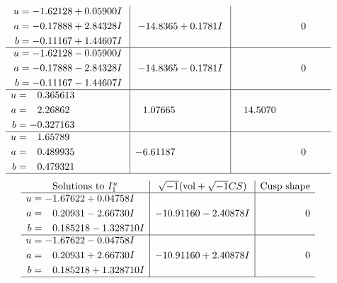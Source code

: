 \documentclass[1p]{elsarticle_modified}
\theoremstyle{definition}
\newcommand{\I}{\sqrt{-1}}
\begin{document}
$$\begin{array}{c|c|c}
\begin{aligned}
u &= -1.62128 + 0.05900 I \\
a &= -0.17888 + 2.84328 I \\
b &= -0.11167 + 1.44607 I\end{aligned}
 & -14.8365 + 0.1781 I & \phantom{-0.000000 } 0 \\ \hline\begin{aligned}
u &= -1.62128 - 0.05900 I \\
a &= -0.17888 - 2.84328 I \\
b &= -0.11167 - 1.44607 I\end{aligned}
 & -14.8365 - 0.1781 I & \phantom{-0.000000 } 0 \\ \hline\begin{aligned}
u &= \phantom{-}0.365613\phantom{ +0.000000I} \\
a &= \phantom{-}2.26862\phantom{ +0.000000I} \\
b &= -0.327163\phantom{ +0.000000I}\end{aligned}
 & \phantom{-}1.07665\phantom{ +0.000000I} & \phantom{-}14.5070\phantom{ +0.000000I} \\ \hline\begin{aligned}
u &= \phantom{-}1.65789\phantom{ +0.000000I} \\
a &= \phantom{-}0.489935\phantom{ +0.000000I} \\
b &= \phantom{-}0.479321\phantom{ +0.000000I}\end{aligned}
 & -6.61187\phantom{ +0.000000I} & \phantom{-0.000000 } 0\\
 \hline 
 \end{array}$$\newpage$$\begin{array}{c|c|c}  
\text{Solutions to }I^u_{1}& \I (\text{vol} + \sqrt{-1}CS) & \text{Cusp shape}\\
 \hline 
\begin{aligned}
u &= -1.67622 + 0.04758 I \\
a &= \phantom{-}0.20931 - 2.66730 I \\
b &= \phantom{-}0.185218 - 1.328710 I\end{aligned}
 & -10.91160 - 2.40878 I & \phantom{-0.000000 } 0 \\ \hline\begin{aligned}
u &= -1.67622 - 0.04758 I \\
a &= \phantom{-}0.20931 + 2.66730 I \\
b &= \phantom{-}0.185218 + 1.328710 I\end{aligned}
 & -10.91160 + 2.40878 I & \phantom{-0.000000 } 0\\
 \hline 
 \end{array}$$\newpage\newpage\renewcommand{\arraystretch}{1}
\end{document}
